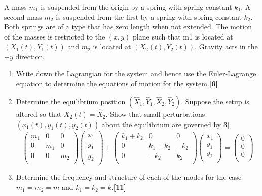\documentclass[a4paper]{article}
\begin{document}
\newpage
\begin{qns}
A mass $m_1$ is suspended from the origin by a spring with spring constant $k_1$. A second mass $m_2$ is suspended from the first by a spring with spring constant $k_2$. Both springs are of a type that has zero length when not extended. The motion of the masses is restricted to the $(x, y)$ plane such that m1 is located at $(X_1(t), Y_1(t))$ and $m_2$ is located at $(X_2(t), Y_2(t))$. Gravity acts in the $−y$ direction.
\begin{enumerate}[label=(\alph*)]
\item Write down the Lagrangian for the system and hence use the Euler-Lagrange equation to determine the equations of motion for the system.\hfill\textbf{[6]}
\item Determine the equilibrium position $(\hat{X}_1,\hat{Y}_1,\hat{X}_2,\hat{Y}_2)$. Suppose the setup is altered so that $X_2(t)=\hat{X}_2$. Show that small perturbations $(x_1(t),y_1(t),y_2(t))$ about the equilibrium are governed by\hfill\textbf{[3]}
$$\begin{pmatrix}m_1&0&0\\0&m_1&0\\0&0&m_2\\\end{pmatrix}\begin{pmatrix}\ddot{x}_1\\\dot{y}_1\\\dot{y}_2\\\end{pmatrix}+\begin{pmatrix}k_1+k_2&0&0\\0&k_1+k_2&-k_2\\0&-k_2&k_2\\\end{pmatrix}\begin{pmatrix}x_1\\y_1\\y_2\\\end{pmatrix}=\begin{pmatrix}0\\0\\0\\\end{pmatrix}$$
\item Determine the frequency and structure of each of the modes for the case $m_1=m_2=m$ and $k_1=k_2=k$.\hfill\textbf{[11]}
\end{enumerate}
\end{qns}
\end{document}
